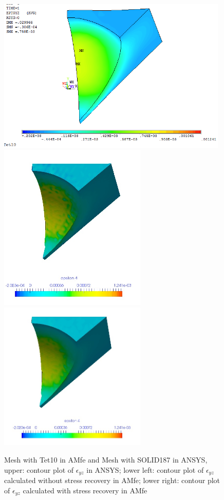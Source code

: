 \begin{figure}[htbp]
	\begin{center}
		\includegraphics[width=11cm,clip]{Tet10_Eyz.png} 	
		\includegraphics[width=7cm,clip]{Tet10_Eyz_PD.png} 	
		\includegraphics[width=7cm,clip]{Tet10_Eyz_P.png} 		
		\caption{Mesh with Tet10 in AMfe and Mesh with SOLID187 in ANSYS, upper: contour plot of $\epsilon_{yz}$ in ANSYS; lower left: contour plot of $\epsilon_{yz}$ calculated without stress recovery in AMfe; lower right: contour plot of $\epsilon_{yz}$ calculated with stress recovery in AMfe} \label{fig: Tet10_Eyz}
	\end{center}
\end{figure}
\clearpage 

